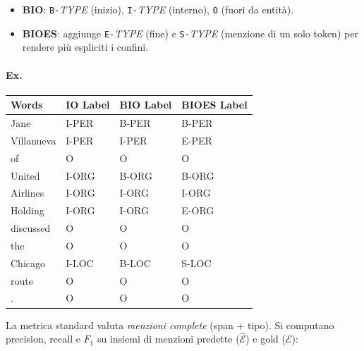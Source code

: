         \begin{itemize}
        
            \item \textbf{BIO}: \texttt{B-}\emph{TYPE} (inizio), \texttt{I-}\emph{TYPE} (interno), \texttt{O} (fuori da entità).
          
            \item \textbf{BIOES}: aggiunge \texttt{E-}\emph{TYPE} (fine) e \texttt{S-}\emph{TYPE} (menzione di un solo token) per rendere più espliciti i confini.
            
        \end{itemize}
        
        \paragraph{Ex.\\}

        \begin{center}
            \begin{tabular}{l l l l}
                \hline
                \textbf{Words} & \textbf{IO Label} & \textbf{BIO Label} & \textbf{BIOES Label} \\
                \hline
                Jane       & I-PER & B-PER & B-PER \\
                Villanueva & I-PER & I-PER & E-PER \\
                of         & O     & O     & O     \\
                United     & I-ORG & B-ORG & B-ORG \\
                Airlines   & I-ORG & I-ORG & I-ORG \\
                Holding    & I-ORG & I-ORG & E-ORG \\
                discussed  & O     & O     & O     \\
                the        & O     & O     & O     \\
                Chicago    & I-LOC & B-LOC & S-LOC \\
                route      & O     & O     & O     \\
                .          & O     & O     & O     \\
                \hline
            \end{tabular} 
        \end{center}       
        
        La metrica standard valuta \emph{menzioni complete} (span + tipo). Si computano precision, recall e $F_1$ su insiemi di menzioni predette ($\widehat{\mathcal{E}}$) e gold ($\mathcal{E}$):
        
